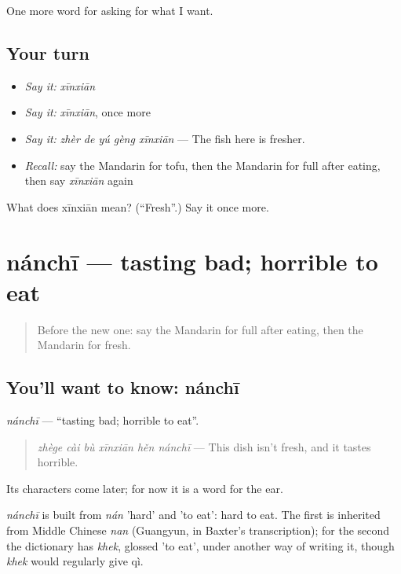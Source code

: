 \begin{grammarlens}[title={What you've built}]
One more word for asking for what I want.
\end{grammarlens}

\subsection*{Your turn}
\begin{itemize}
\raggedright
  \item \emph{Say it:} \emph{xīnxiān}
  \item \emph{Say it:} \emph{xīnxiān}, once more
  \item \emph{Say it:} \emph{zhèr de yú gèng xīnxiān} — The fish here is fresher.
  \item \emph{Recall:} say the Mandarin for tofu, then the Mandarin for full after eating, then say \emph{xīnxiān} again
\end{itemize}

\begin{tcolorbox}[breakable,colback=teal!4,colframe=teal!35!black,title={Before you move on}]
What does xīnxiān mean? (\textquotedblleft{}Fresh\textquotedblright{}.) Say it once more.
\end{tcolorbox}
\section[nánchī]{nánchī — tasting bad; horrible to eat}

\label{lesson:ZH-C177-nanchi}



\begin{quote}
Before the new one: say the Mandarin for full after eating, then the Mandarin for fresh.
\end{quote}

\subsection*{You'll want to know: nánchī}
\emph{nánchī} — \textquotedblleft{}tasting bad; horrible to eat\textquotedblright{}.

\begin{quote}
\emph{zhège cài bù xīnxiān hěn nánchī} — This dish isn't fresh, and it tastes horrible.
\end{quote}

Its characters come later; for now it is a word for the ear.

\begin{cousinweb}
\emph{nánchī} is built from \emph{nán} 'hard' and  'to eat': hard to eat. The first is inherited from Middle Chinese \emph{nan} (Guangyun, in Baxter's transcription); for the second the dictionary has \emph{khek}, glossed 'to eat', under another way of writing it, though \emph{khek} would regularly give qì.
\end{cousinweb}

